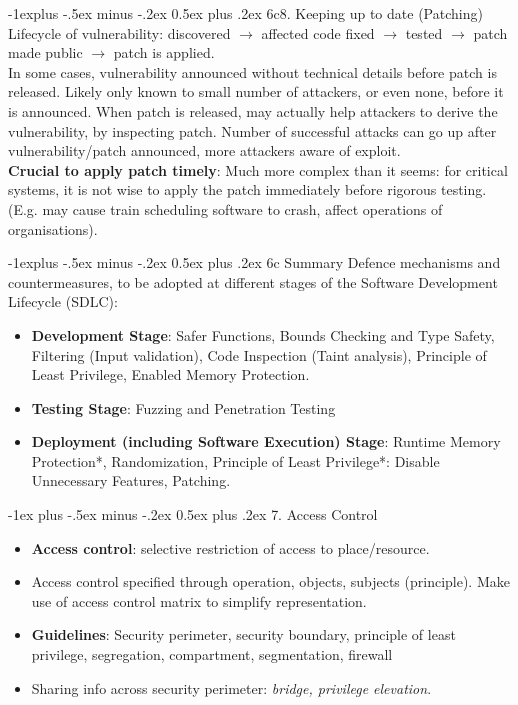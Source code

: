 \documentclass[10pt, landscape]{article}
\makeatletter
\renewcommand{\section}{\@startsection{section}{1}{0mm}%
                                {-1ex plus -.5ex minus -.2ex}%
                                {0.5ex plus .2ex}%
                                {\normalfont\large\bfseries}}
\renewcommand{\subsection}{\@startsection{subsection}{2}{0mm}%
                                {-1explus -.5ex minus -.2ex}%
                                {0.5ex plus .2ex}%
                                {\normalfont\normalsize\bfseries}}
\makeatother
\begin{document}
\begin{multicols*}{3}
\subsection{6c8. Keeping up to date (Patching)}
Lifecycle of vulnerability: discovered $\rightarrow$ affected code fixed $\rightarrow$  tested $\rightarrow$ patch made public $\rightarrow$
patch is applied. \\
In some cases, vulnerability announced without technical details before patch is released. Likely only known to small number of attackers, 
or even none, before it is announced. When patch is released, may actually help attackers to derive the vulnerability, by inspecting patch. Number of successful attacks can go up after vulnerability/patch announced, more attackers aware of exploit. \\
\textbf{Crucial to apply patch timely}: Much more complex than it seems: for critical systems, it is not wise to apply the patch immediately before rigorous testing. (E.g. may cause train scheduling software to crash, affect operations of organisations).

\subsection{6c Summary}
Defence mechanisms and countermeasures, to be adopted at different stages of the Software Development Lifecycle (SDLC):
\begin{itemize}
\item \textbf{Development Stage}: Safer Functions, Bounds Checking and Type Safety, Filtering (Input validation), Code Inspection (Taint analysis), Principle of Least Privilege, Enabled Memory Protection.
\item \textbf{Testing Stage}: Fuzzing and Penetration Testing
\item \textbf{Deployment (including Software Execution) Stage}: Runtime Memory Protection*, Randomization, Principle of Least Privilege*: Disable Unnecessary Features, Patching.
\end{itemize}



\vfill \null
\columnbreak

\section{7. Access Control}
\begin{itemize}
\item \textbf{Access control}: selective restriction of access to place/resource.
\item Access control specified through operation, objects, subjects (principle). Make use of access control matrix to simplify representation. 
\item \textbf{Guidelines}: Security perimeter, security boundary, principle of least privilege, segregation, compartment, segmentation, firewall
\item Sharing info across security perimeter: \textit{bridge, privilege elevation}.
\end{itemize}



\end{multicols*}
\end{document}
